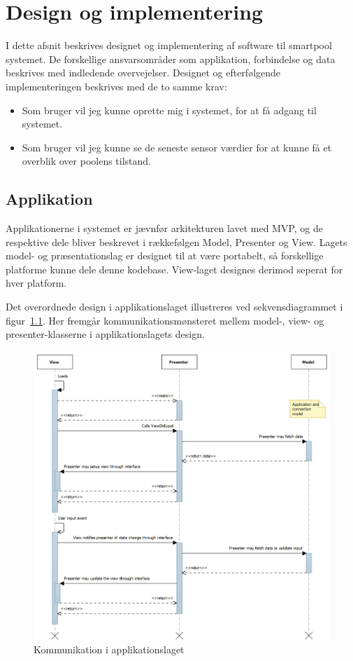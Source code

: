 \chapter{Design og implementering}\label{cha:design}
I dette afsnit beskrives designet og implementering af software til \gls{smartpool} systemet. De forskellige ansvarsområder som applikation, forbindelse og data beskrives med indledende overvejelser. 
Designet og efterfølgende implementeringen beskrives med de to samme krav: 

\begin{itemize}
	\item Som bruger vil jeg kunne oprette mig i systemet, for at få adgang til systemet.
	\item Som bruger vil jeg kunne se de seneste sensor værdier for at kunne få et overblik over 
	poolens tilstand.
\end{itemize}

\section{Applikation}
Applikationerne i systemet er jævnfør arkitekturen lavet med MVP, og de respektive dele bliver beskrevet i rækkefølgen Model, Presenter og View. Lagets model- og præsentationslag er designet til at være portabelt, så forskellige platforme kunne dele denne kodebase. View-laget designes derimod seperat for hver platform. 

Det overordnede design i applikationslaget illustreres ved sekvensdiagrammet i figur~\ref{fig:application_sd}. Her fremgår kommunikationsmønsteret mellem model-, view- og presenter-klasserne i applikationslagets design.

\begin{figure}
	\centering
	\includegraphics[width=1.0\linewidth]{figs/design/application_sd}
	\caption{Kommunikation i applikationslaget}
	\label{fig:application_sd}
\end{figure}

